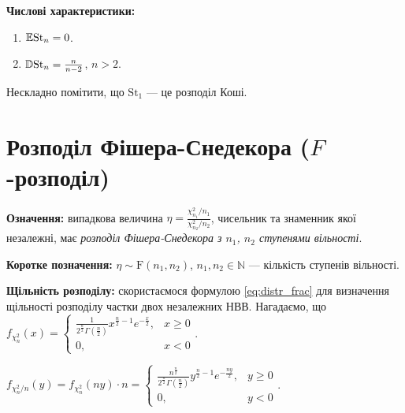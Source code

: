 \noindent\textbf{Числові характеристики:}
\begin{enumerate}
    \item $\mathbb{E}\mathrm{St}_n = 0$.
    \item $\mathbb{D}\mathrm{St}_n = \frac{n}{n-2}$, $n>2$.
\end{enumerate}

\begin{remark}
    Нескладно помітити, що $\mathrm{St}_1$ --- це розподіл Коші. 
\end{remark}

\section{Розподіл Фішера-Снедекора (\texorpdfstring{$F$}{F}-розподіл)}
\noindent\textbf{Означення:} випадкова величина $\eta = \frac{\chi_{n_1}^2/n_1}{\chi_{n_2}^2/n_2}$, чисельник
та знаменник якої незалежні, має \emph{розподіл Фішера-Снедекора з $n_1$, $n_2$ ступенями вільності}.

\noindent\textbf{Коротке позначення:} $\eta \sim \mathrm{F}(n_1, n_2)$, $n_1, n_2\in\mathbb{N}$ --- кількість ступенів вільності.

\noindent\textbf{Щільність розподілу:} скористаємося формулою \eqref{eq:distr_frac} для визначення щільності розподілу частки
двох незалежних НВВ. Нагадаємо, що 
$f_{\chi_n^2}(x) = \begin{cases}
    \frac{1}{2^{\frac{n}{2}} \Gamma\left(\frac{n}{2}\right)} x^{\frac{n}{2}-1} e^{-\frac{x}{2}}, & x \geq 0 \\
    0, & x < 0
\end{cases}$.

 $f_{\chi_n^2/n}(y) = f_{\chi_n^2}(n y) \cdot n = 
\begin{cases}
    \frac{n^{\frac{n}{2}}}{2^{\frac{n}{2}} \Gamma\left(\frac{n}{2}\right)} y^{\frac{n}{2}-1} e^{-\frac{ny}{2}}, & y \geq 0 \\
    0, & y < 0
\end{cases}$.

